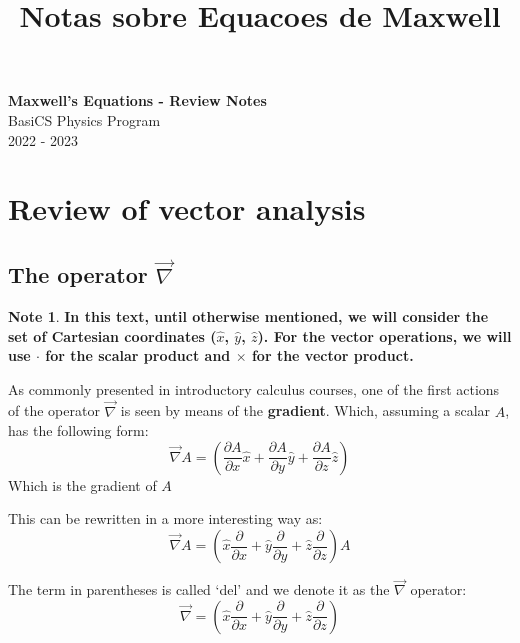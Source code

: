 \documentclass[11pt]{article}
\theoremstyle{definition}
\newtheorem{note}{Note}
\begin{document}
\setcounter{section}{0}
\title{Notas sobre Equacoes de Maxwell}

\thispagestyle{empty}

\begin{center}
{\LARGE \bf Maxwell's Equations - Review Notes}\\
{\large BasiCS Physics Program}\\
2022 - 2023
\end{center}
\section{Review of vector analysis}
\subsection{The operator $\vec{\nabla}$}
\begin{note}
\textbf{In this text, until otherwise mentioned, we will consider the set of Cartesian coordinates ($\hat{x}$, $\hat{y}$, $\hat{z}$). For the
vector operations, we will use $\cdot$ for the scalar product and $\times$ for the vector product.}
\end{note}

As commonly presented in introductory calculus courses, one of the first actions of the operator $\vec{\nabla}$ is seen by means of the \textbf{gradient}.
Which, assuming a scalar $A$, has the following form:
\begin{equation}
\vec{\nabla} A = \left(\frac{\partial A}{\partial x}\hat{x}+\frac{\partial A}{\partial y}\hat{y}+\frac{\partial A}{\partial z}\hat{z}\right)
\end{equation}
Which is the gradient of $A$ 

This can be rewritten in a more interesting way as:
\begin{equation}
\vec{\nabla} A = \left(\hat{x}\frac{\partial}{\partial x}+\hat{y}\frac{\partial}{\partial y}+\hat{z}\frac{\partial}{\partial z}\right)A
\end{equation}

The term in parentheses is called `del' and we denote it as the $\vec{\nabla}$ operator:
\begin{equation}
\vec{\nabla} = \left(\hat{x}\frac{\partial}{\partial x}+\hat{y}\frac{\partial}{\partial y}+\hat{z}\frac{\partial}{\partial z}\right)
\end{equation}
\end{document}
